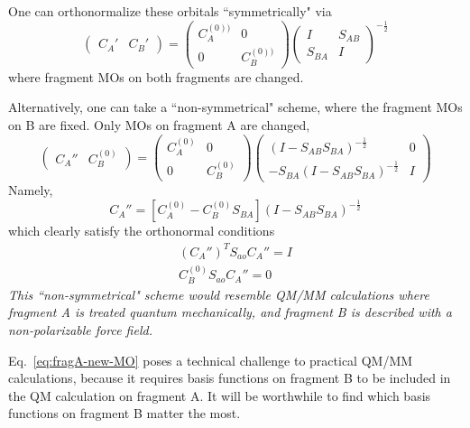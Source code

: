\documentclass[aip,jcp,preprint,superscriptaddress,amsmath,amssymb]{revtex4-1}
\begin{document}
One can orthonormalize these orbitals ``symmetrically" via
\begin{equation}
\begin{pmatrix}
C_{A}' & C_{B}'  
\end{pmatrix}
= \begin{pmatrix}
C_{A}^{(0))} & 0 \\ 
0 & C_{B}^{(0))}
\end{pmatrix}
\begin{pmatrix}
I & S_{AB} \\ 
S_{BA} & I  
\end{pmatrix}
^{-\frac{1}{2}}
\end{equation}
where fragment MOs on both fragments are changed.   

 Alternatively, one can take a ``non-symmetrical" scheme, where the fragment MOs on B are fixed.    Only MOs on fragment A are changed,
\begin{equation}
\begin{pmatrix}
C_{A}'' & C_{B}^{(0)}  
\end{pmatrix}
= \begin{pmatrix}
C_{A}^{(0)} & 0 \\ 
0 & C_{B}^{(0)}
\end{pmatrix}
\begin{pmatrix}
(I - S_{AB}S_{BA})^{-\frac{1}{2}} & 0\\ 
- S_{BA} (I - S_{AB}S_{BA})^{-\frac{1}{2}}  & I 
\end{pmatrix}
\end{equation}
Namely,
\begin{equation}
C_{A}'' = \left[ C_{A}^{(0)} - C_{B}^{(0)} S_{BA} \right] (I - S_{AB}S_{BA})^{-\frac{1}{2}} 
\label{eq:fragA-new-MO}
\end{equation}
which clearly satisfy the orthonormal conditions
\begin{eqnarray}
\left(C_{A}''\right)^{T} S_{ao} C_{A}'' = I  \\
C_{B}^{(0)} S_{ao} C_{A}'' = 0
\end{eqnarray}
\emph{This ``non-symmetrical" scheme would resemble QM/MM calculations
where fragment A is treated quantum mechanically, and fragment B is described with a non-polarizable force field.  }

Eq.~\ref{eq:fragA-new-MO} poses a technical challenge to practical QM/MM calculations, 
because it requires basis functions on fragment B to be included in the QM calculation on fragment A.  
It will be worthwhile to find which basis functions on fragment B matter the most.  
\end{document}
